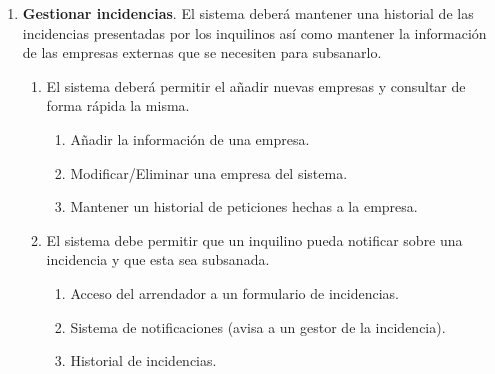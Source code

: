 \documentclass[10pt,a4paper]{article}
\begin{document}
{\begin{enumerate}[\bfseries RF-1]
\begin{enumerate}[\bfseries RF-{5}.1]
\begin{enumerate}[\bfseries RF-{5}.{2}.1]
\end{enumerate}
\item Modificar información de un usuario
\item Eliminar a un usuario del sistema
\item Gestionar los pagos del usuario
\begin{enumerate}[\bfseries RF-{5}.{5}.1]
\item Pago de la renta de alquiler
\item Cobro de rentas de alquiler
\item Pago de deudas pendientes
\end{enumerate}
\end{enumerate}
\item \textbf{Gestionar incidencias}. El sistema deberá mantener una historial de las incidencias presentadas por los inquilinos así como mantener la información de las empresas externas que se necesiten para subsanarlo.
\begin{enumerate}[\bfseries RF-{6}.1]
\item El sistema deberá permitir el añadir nuevas empresas y consultar de forma rápida la misma.
\begin{enumerate}[\bfseries RF-{6}.{1}.1]
\item Añadir la información de una empresa.
\item Modificar/Eliminar una empresa del sistema.
\item Mantener un historial de peticiones hechas a la empresa.
\end{enumerate}
\item El sistema debe permitir que un inquilino pueda notificar sobre una incidencia y que esta sea subsanada.
\begin{enumerate}[\bfseries RF-{6}.{1}.1]
\item Acceso del arrendador a un formulario de incidencias.
\item Sistema de notificaciones (avisa a un gestor de la incidencia).
\item Historial de incidencias.
\end{enumerate}
\end{enumerate}
\end{enumerate}

}
\end{document}
